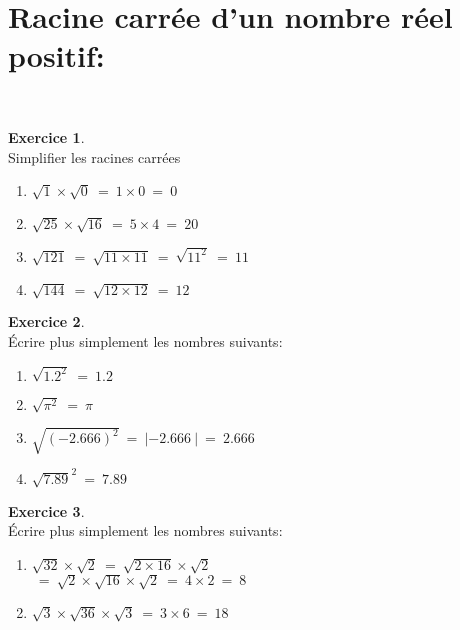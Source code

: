 \documentclass[10pt,a4paper]{article}
\theoremstyle{definition}
\theoremstyle{definition}
\newtheorem{exo}{Exercice}
\begin{document}
\section*{Racine carrée d'un nombre réel positif:}
\quad\\
\begin{center}
	\begin{minipage}[c]{0.4\linewidth}
		\raggedright
		\begin{exo}\quad\\
			Simplifier les racines carrées 
				\begin{enumerate}
					\item $\sqrt{1}\times\sqrt{0} \ = \ 1 \times0  \ = \ 0$
					\item $\sqrt{25} \times \sqrt{16} \ = \ 5\times4 \ = \ 20 $
					
					\item $\sqrt{121} \ = \ \sqrt{11\times11} \ = \ \sqrt{11^2} \ = \ 11$
					\item $\sqrt{144} \ = \ \sqrt{12\times12} \ = \ 12$
					
				\end{enumerate}

		\end{exo}
		\begin{exo}\quad\hfill\textbf{}\\
			Écrire plus simplement les nombres suivants:
	
				\begin{enumerate}
					\item $\sqrt{1.2^{2}} \ = \ 1.2 $
					\item $\sqrt{\pi^{2}} \ = \ \pi$
					
					\item $\sqrt{\left(-2.666\right)^{2}} \ = \ |-2.666~| \ = \ 2.666$
					\item $\left. \sqrt{7.89}\right.^2 \ = \ 7.89$
				\end{enumerate}

		\end{exo}
		\begin{exo}\quad\hfill\textbf{}\\
			Écrire plus simplement les nombres suivants:
			
				\begin{enumerate}
					\item $\sqrt{32}\times \sqrt{2} \ = \ \sqrt{2\times16}\times\sqrt{2}$ \\ $\ = \ \sqrt{2} \times \sqrt{16}\times\sqrt{2} \ = \ 4\times 2 \ = \ 8  $
					\item $\sqrt{3}\times \sqrt{36}\times \sqrt{3} \ = \ 3\times6 \ = \ 18$
					

\end{enumerate}
\end{exo}
\end{minipage}
\end{center}
\end{document}
